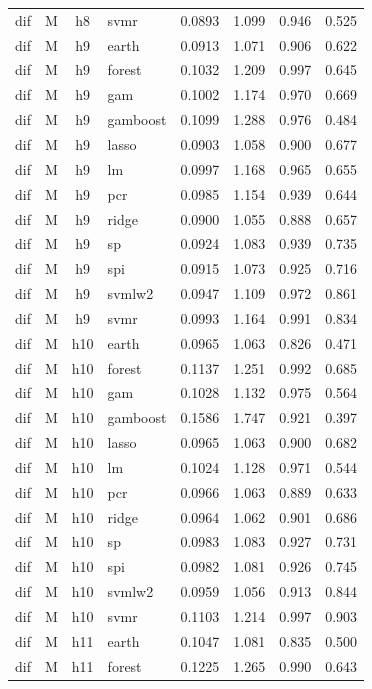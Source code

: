 \begin{ThreePartTable}
\begin{longtable}[t]{llclcccc}
dif & M & h8 & svmr & 0.0893 & 1.099 & 0.946 & 0.525\\
\addlinespace
dif & M & h9 & earth & 0.0913 & 1.071 & 0.906 & 0.622\\
dif & M & h9 & forest & 0.1032 & 1.209 & 0.997 & 0.645\\
dif & M & h9 & gam & 0.1002 & 1.174 & 0.970 & 0.669\\
dif & M & h9 & gamboost & 0.1099 & 1.288 & 0.976 & 0.484\\
dif & M & h9 & lasso & 0.0903 & 1.058 & 0.900 & 0.677\\
dif & M & h9 & lm & 0.0997 & 1.168 & 0.965 & 0.655\\
dif & M & h9 & pcr & 0.0985 & 1.154 & 0.939 & 0.644\\
dif & M & h9 & ridge & 0.0900 & 1.055 & 0.888 & 0.657\\
dif & M & h9 & sp & 0.0924 & 1.083 & 0.939 & 0.735\\
dif & M & h9 & spi & 0.0915 & 1.073 & 0.925 & 0.716\\
dif & M & h9 & svmlw2 & 0.0947 & 1.109 & 0.972 & 0.861\\
dif & M & h9 & svmr & 0.0993 & 1.164 & 0.991 & 0.834\\
\addlinespace
dif & M & h10 & earth & 0.0965 & 1.063 & 0.826 & 0.471\\
dif & M & h10 & forest & 0.1137 & 1.251 & 0.992 & 0.685\\
dif & M & h10 & gam & 0.1028 & 1.132 & 0.975 & 0.564\\
dif & M & h10 & gamboost & 0.1586 & 1.747 & 0.921 & 0.397\\
dif & M & h10 & lasso & 0.0965 & 1.063 & 0.900 & 0.682\\
dif & M & h10 & lm & 0.1024 & 1.128 & 0.971 & 0.544\\
dif & M & h10 & pcr & 0.0966 & 1.063 & 0.889 & 0.633\\
dif & M & h10 & ridge & 0.0964 & 1.062 & 0.901 & 0.686\\
dif & M & h10 & sp & 0.0983 & 1.083 & 0.927 & 0.731\\
dif & M & h10 & spi & 0.0982 & 1.081 & 0.926 & 0.745\\
dif & M & h10 & svmlw2 & 0.0959 & 1.056 & 0.913 & 0.844\\
dif & M & h10 & svmr & 0.1103 & 1.214 & 0.997 & 0.903\\
\addlinespace
dif & M & h11 & earth & 0.1047 & 1.081 & 0.835 & 0.500\\
dif & M & h11 & forest & 0.1225 & 1.265 & 0.990 & 0.643\\

\end{longtable}
\end{ThreePartTable}
